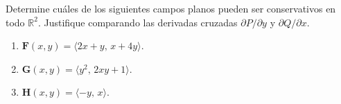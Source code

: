 Determine cuáles de los siguientes campos planos pueden ser conservativos en todo $\mathbb{R}^2$. Justifique comparando las derivadas cruzadas $\partial P/\partial y$ y $\partial Q/\partial x$.
\begin{enumerate}
    \item $\mathbf{F}(x,y)=\langle 2x+y,\,x+4y\rangle$.
    \item $\mathbf{G}(x,y)=\langle y^2,\,2xy+1\rangle$.
    \item $\mathbf{H}(x,y)=\langle -y,\,x\rangle$.
\end{enumerate}
